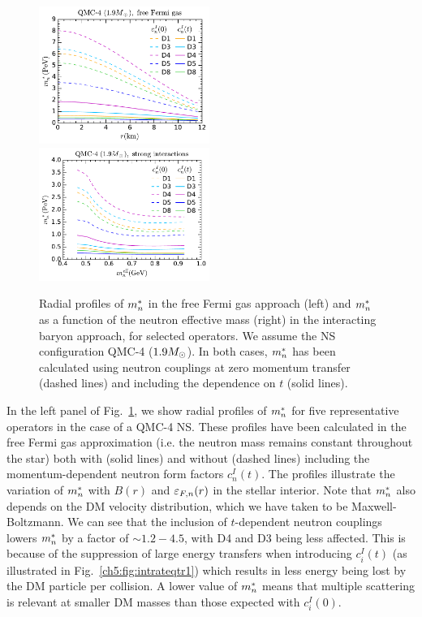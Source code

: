   \begin{figure}[t!bp]
    \centering
\includegraphics[width=0.495\textwidth]{capture_3/mnstar_r_QMC4_free_Fermi.pdf}    
\includegraphics[width=0.495\textwidth]{capture_3/mnstar_mn_QMC4.pdf}
    \caption[Radial profiles of $\mnstar$ in the free Fermi gas approach (left) and $\mnstar$ as a function of the neutron effective mass (right) in the interacting baryon approach, for selected operators.]{Radial profiles of $\mnstar$ in the free Fermi gas approach (left) and $\mnstar$ as a function of the neutron effective mass (right) in the interacting baryon approach, for selected operators. We assume the NS configuration QMC-4 ($1.9M_\odot$). In both cases, $\mnstar$ has been calculated using neutron couplings at zero momentum transfer (dashed lines) and including the dependence on $t$ (solid lines). }
    \label{ch5:fig:mstar}
\end{figure}


In the left panel of Fig.~\ref{ch5:fig:mstar}, we show radial profiles of $\mnstar$ for five representative operators in the case of a QMC-4 NS. These profiles have been calculated in the free Fermi gas approximation (i.e. the neutron mass remains constant throughout the star) both with (solid lines) and without (dashed lines) including the momentum-dependent neutron form factors $c_n^I(t)$. 
The profiles illustrate the variation of $\mnstar$ with $B(r)$ and $\varepsilon_{F,n}(r)$ in the stellar interior. Note that $\mnstar$ also depends on the  DM velocity distribution, which we have taken to be Maxwell-Boltzmann. We can see that the inclusion of $t$-dependent neutron couplings lowers $\mnstar$ by a factor of $\sim 1.2 - 4.5$, with D4 and D3 being less affected. 
This is because of the suppression of large energy transfers when introducing  $c_i^I(t)$ (as illustrated in Fig.~\ref{ch5:fig:intrateqtr1}) which results in less energy being lost by the DM particle per collision.  A lower value of $\mnstar$ means that multiple scattering is relevant at smaller DM masses than those expected with $c_i^I(0)$. 

